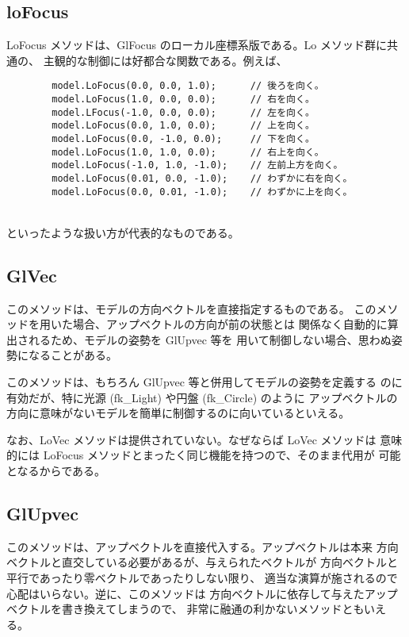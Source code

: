 \subsection{loFocus}
LoFocus メソッドは、GlFocus のローカル座標系版である。Lo メソッド群に共通の、
主観的な制御には好都合な関数である。例えば、
\\
\begin{breakbox}
\begin{verbatim}
        model.LoFocus(0.0, 0.0, 1.0);      // 後ろを向く。
        model.LoFocus(1.0, 0.0, 0.0);      // 右を向く。
        model.LFocus(-1.0, 0.0, 0.0);      // 左を向く。
        model.LoFocus(0.0, 1.0, 0.0);      // 上を向く。
        model.LoFocus(0.0, -1.0, 0.0);     // 下を向く。
        model.LoFocus(1.0, 1.0, 0.0);      // 右上を向く。
        model.LoFocus(-1.0, 1.0, -1.0);    // 左前上方を向く。
        model.LoFocus(0.01, 0.0, -1.0);    // わずかに右を向く。
        model.LoFocus(0.0, 0.01, -1.0);    // わずかに上を向く。
\end{verbatim}
\end{breakbox}
~ \\
といったような扱い方が代表的なものである。

\subsection{GlVec}
このメソッドは、モデルの方向ベクトルを直接指定するものである。
このメソッドを用いた場合、アップベクトルの方向が前の状態とは
関係なく自動的に算出されるため、モデルの姿勢を GlUpvec 等を
用いて制御しない場合、思わぬ姿勢になることがある。

このメソッドは、もちろん GlUpvec 等と併用してモデルの姿勢を定義する
のに有効だが、特に光源 (fk\_Light) や円盤 (fk\_Circle) のように
アップベクトルの方向に意味がないモデルを簡単に制御するのに向いているといえる。

なお、LoVec メソッドは提供されていない。なぜならば LoVec メソッドは
意味的には LoFocus メソッドとまったく同じ機能を持つので、そのまま代用が
可能となるからである。

\subsection{GlUpvec}
このメソッドは、アップベクトルを直接代入する。アップベクトルは本来
方向ベクトルと直交している必要があるが、与えられたベクトルが
方向ベクトルと平行であったり零ベクトルであったりしない限り、
適当な演算が施されるので心配はいらない。逆に、このメソッドは
方向ベクトルに依存して与えたアップベクトルを書き換えてしまうので、
非常に融通の利かないメソッドともいえる。

